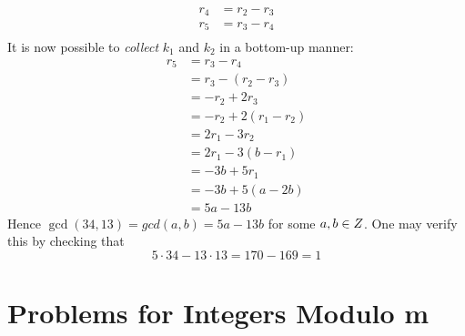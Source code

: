 \begin{remark}
\begin{equation}
\begin{aligned}
                r_4         &= r_2 - r_3 \\
                \boxed{r_5} &= r_3 - r_4 \\
                \phantom{}  &\phantom{}
            \end{aligned}
        \end{equation}
        It is now possible to \textit{collect} $k_1$ and $k_2$ in a bottom-up manner:
        \begin{align}
            \boxed{r_5} &= r_3 - r_4 \\
                        &= r_3 - (r_2 - r_3) \\
                        &= -r_2 + 2r_3 \\
                        &= -r_2 + 2(r_1 - r_2) \\
                        &= 2r_1 - 3r_2 \\
                        &= 2r_1 - 3(b - r_1) \\
                        &= -3b + 5r_1 \\
                        &= -3b + 5(a - 2b) \\
                        &= 5a - 13b
        \end{align}
        Hence $\gcd(34, 13) = gcd(a, b) = 5a - 13b$ for some $a, b \in \relax{Z}$. One may verify this by checking that
        \begin{equation}
            5 \cdot 34 - 13 \cdot 13 = 170 - 169 = 1
        \end{equation}
\end{remark}

\section{Problems for Integers Modulo m}

